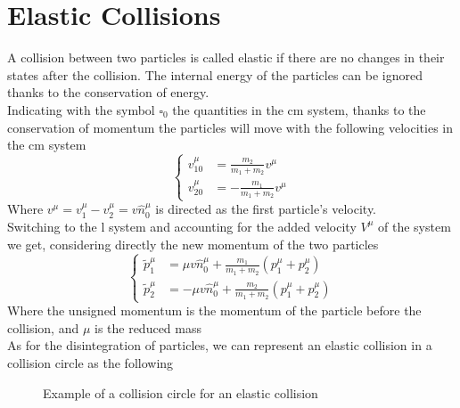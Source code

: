\documentclass[../admech.tex]{subfiles}
\begin{document}
\section{Elastic Collisions}
A collision between two particles is called elastic if there are no changes in their states after the collision. The internal energy of the particles can be ignored thanks to the conservation of energy.\\
Indicating with the symbol $\square_0$ the quantities in the cm system, thanks to the conservation of momentum the particles will move with the following velocities in the cm system
\begin{equation}
	\left\{ \begin{aligned}
			v_{10}^\mu&=\frac{m_2}{m_1+m_2}v^\mu\\
			v_{20}^\mu&=-\frac{m_1}{m_1+m_2}v^\mu
	\end{aligned}\right.
	\label{eq:ecolv}
\end{equation}
Where $v^\mu=v_1^\mu-v_2^\mu=v\hat{n}_0^\mu$ is directed as the first particle's velocity.\\
Switching to the l system and accounting for the added velocity $V^\mu$ of the system we get, considering directly the new momentum of the two particles
\begin{equation}
	\left\{\begin{aligned}
			\tilde{p}_1^\mu&=\mu v\hat{n}_0^\mu+\frac{m_1}{m_1+m_2}(p_1^\mu+p_2^\mu)\\
			\tilde{p}_2^\mu&=-\mu v\hat{n}_0^\mu+\frac{m_2}{m_1+m_2}(p_1^\mu+p_2^\mu)
	\end{aligned}\right.
	\label{eq:ecolpl}
\end{equation}
Where the unsigned momentum is the momentum of the particle before the collision, and $\mu$ is the reduced mass\\
As for the disintegration of particles, we can represent an elastic collision in a collision circle as the following\\
\begin{minipage}[c]{0.5\textwidth}
	\begin{figure}[H]
		\centering
		\caption{Example of a collision circle for an elastic collision}
		\label{fig:exeecolcirc}
	\end{figure}
\end{minipage}
\end{document}
